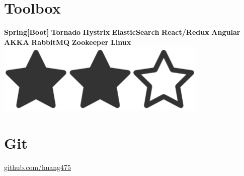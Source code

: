 \documentclass[]{friggeri-cv}
\begin{document}
\begin{aside}
  \section{Toolbox}
  	\textbf{Spring[Boot]}
  	\textbf{Tornado}
  	\textbf{Hystrix}
  	\textbf{ElasticSearch}
  	\textbf{React/Redux}
  	\textbf{Angular}
  	\textbf{AKKA}
  	\textbf{RabbitMQ}
  	\textbf{Zookeeper}
    \textbf{Linux  }\includegraphics[scale=0.07]{img/2heart.png}
    ~
  \section{Git}
    \href{https://github.com/huang475}{github.com/huang475}
    ~
\end{aside}
~
~
~
\end{document}
